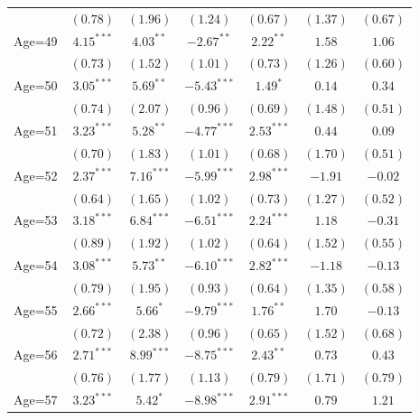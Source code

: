 \documentclass[fullpage]{paper}
\begin{document}
\begin{center}
\begin{longtable}{l c c c c c c }
            & $(0.78)$      & $(1.96)$      & $(1.24)$       & $(0.67)$      & $(1.37)$      & $(0.67)$      \\
Age=49      & $4.15^{***}$  & $4.03^{**}$   & $-2.67^{**}$   & $2.22^{**}$   & $1.58$        & $1.06$        \\
            & $(0.73)$      & $(1.52)$      & $(1.01)$       & $(0.73)$      & $(1.26)$      & $(0.60)$      \\
Age=50      & $3.05^{***}$  & $5.69^{**}$   & $-5.43^{***}$  & $1.49^{*}$    & $0.14$        & $0.34$        \\
            & $(0.74)$      & $(2.07)$      & $(0.96)$       & $(0.69)$      & $(1.48)$      & $(0.51)$      \\
Age=51      & $3.23^{***}$  & $5.28^{**}$   & $-4.77^{***}$  & $2.53^{***}$  & $0.44$        & $0.09$        \\
            & $(0.70)$      & $(1.83)$      & $(1.01)$       & $(0.68)$      & $(1.70)$      & $(0.51)$      \\
Age=52      & $2.37^{***}$  & $7.16^{***}$  & $-5.99^{***}$  & $2.98^{***}$  & $-1.91$       & $-0.02$       \\
            & $(0.64)$      & $(1.65)$      & $(1.02)$       & $(0.73)$      & $(1.27)$      & $(0.52)$      \\
Age=53      & $3.18^{***}$  & $6.84^{***}$  & $-6.51^{***}$  & $2.24^{***}$  & $1.18$        & $-0.31$       \\
            & $(0.89)$      & $(1.92)$      & $(1.02)$       & $(0.64)$      & $(1.52)$      & $(0.55)$      \\
Age=54      & $3.08^{***}$  & $5.73^{**}$   & $-6.10^{***}$  & $2.82^{***}$  & $-1.18$       & $-0.13$       \\
            & $(0.79)$      & $(1.95)$      & $(0.93)$       & $(0.64)$      & $(1.35)$      & $(0.58)$      \\
Age=55      & $2.66^{***}$  & $5.66^{*}$    & $-9.79^{***}$  & $1.76^{**}$   & $1.70$        & $-0.13$       \\
            & $(0.72)$      & $(2.38)$      & $(0.96)$       & $(0.65)$      & $(1.52)$      & $(0.68)$      \\
Age=56      & $2.71^{***}$  & $8.99^{***}$  & $-8.75^{***}$  & $2.43^{**}$   & $0.73$        & $0.43$        \\
            & $(0.76)$      & $(1.77)$      & $(1.13)$       & $(0.79)$      & $(1.71)$      & $(0.79)$      \\
Age=57      & $3.23^{***}$  & $5.42^{*}$    & $-8.98^{***}$  & $2.91^{***}$  & $0.79$        & $1.21$        \\

\end{longtable}
\end{center}
\end{document}
